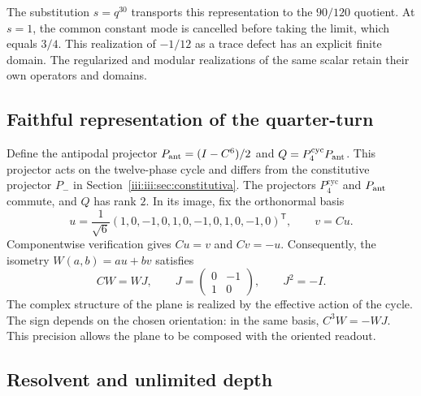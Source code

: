 The substitution $s=q^{30}$ transports this representation to the
$90/120$ quotient. At $s=1$, the common constant mode is cancelled before taking
the limit, which equals $3/4$. This realization of $-1/12$ as a trace defect
has an explicit finite domain. The regularized and modular
realizations of the same scalar retain their own operators and domains.

\subsection{Faithful representation of the quarter-turn}

Define the antipodal projector $P_{\rm ant}=(I-C^6)/2$ and
$Q=P_4^{\mathrm{cyc}}P_{\rm ant}$. This projector acts on the twelve-phase cycle and
differs from the constitutive projector $P_-$ in Section~\ref{iii:iii:sec:constitutiva}.
The projectors $P_4^{\mathrm{cyc}}$ and $P_{\rm ant}$ commute, and
$Q$ has rank $2$. In its image, fix the orthonormal basis
\begin{equation}
 u=\frac1{\sqrt6}(1,0,-1,0,1,0,-1,0,1,0,-1,0)^{\mathsf T},
 \qquad v=Cu.
 \label{iii:iii:eq:uv}
\end{equation}
Componentwise verification gives $Cu=v$ and $Cv=-u$. Consequently,
the isometry $W(a,b)=au+bv$ satisfies
\begin{equation}
 CW=WJ,\qquad
 J=\begin{pmatrix}0&-1\\1&0\end{pmatrix},\qquad J^2=-I.
 \label{iii:iii:eq:quarter-intertwiner}
\end{equation}
The complex structure of the plane is realized by the effective action of
the cycle. The sign depends on the chosen orientation: in the same basis,
$C^3W=-WJ$. This precision allows the plane to be composed with the oriented readout.

\subsection{Resolvent and unlimited depth}

